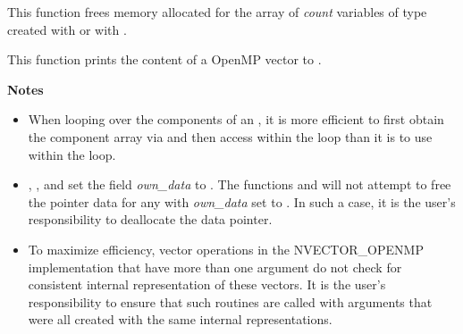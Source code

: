 \documentclass[letterpaper,10pt,english]{sphinxmanual}
\begin{document}

\begin{fulllineitems}
\label{nvectors/NVector_OpenMP:N_VDestroyVectorArray_OpenMP}
This function frees memory allocated for the array of \emph{count}
variables of type  created with
{\hyperref[nvectors/NVector_OpenMP:N_VCloneVectorArray_OpenMP]{}} or with
{\hyperref[nvectors/NVector_OpenMP:N_VCloneEmptyVectorArray_OpenMP]{}}.

\end{fulllineitems}


\begin{fulllineitems}
\label{nvectors/NVector_OpenMP:N_VPrint_OpenMP}
This function prints the content of a OpenMP vector to .

\end{fulllineitems}


\textbf{Notes}
\begin{itemize}
\item {} 
When looping over the components of an , it is more
efficient to first obtain the component array via  and then access  within the loop than it
is to use  within the loop.

\item {} 
{\hyperref[nvectors/NVector_OpenMP:N_VNewEmpty_OpenMP]{}}, {\hyperref[nvectors/NVector_OpenMP:N_VMake_OpenMP]{}}, and
{\hyperref[nvectors/NVector_OpenMP:N_VCloneEmptyVectorArray_OpenMP]{}} set the field \emph{own\_data}
to .  The functions  and
{\hyperref[nvectors/NVector_OpenMP:N_VDestroyVectorArray_OpenMP]{}} will not attempt to free the
pointer data for any  with \emph{own\_data} set to .
In such a case, it is the user's responsibility to deallocate the
data pointer.

\item {} 
To maximize efficiency, vector operations in the NVECTOR\_OPENMP
implementation that have more than one  argument do not
check for consistent internal representation of these vectors. It is
the user's responsibility to ensure that such routines are called
with  arguments that were all created with the same
internal representations.

\end{itemize}
\end{document}
